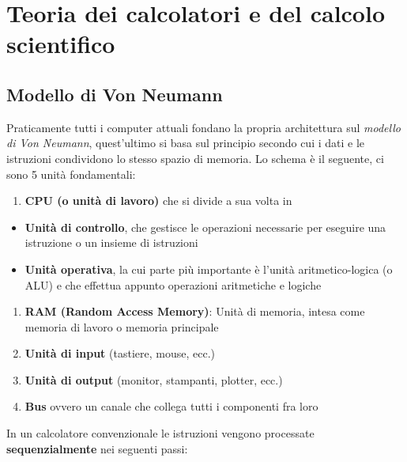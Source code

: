 \documentclass[italian,]{article}
\providecommand{\tightlist}{%
  \setlength{\itemsep}{0pt}\setlength{\parskip}{0pt}}
\begin{document}
\newpage

\section{Teoria dei calcolatori e del calcolo
scientifico}\label{teoria-dei-calcolatori-e-del-calcolo-scientifico}

\subsection{Modello di Von Neumann}\label{modello-di-von-neumann}

Praticamente tutti i computer attuali fondano la propria architettura
sul \emph{modello di Von Neumann}, quest'ultimo si basa sul principio
secondo cui i dati e le istruzioni condividono lo stesso spazio di
memoria. Lo schema è il seguente, ci sono 5 unità fondamentali:

\begin{enumerate}
\def\labelenumi{\arabic{enumi}.}
\tightlist
\item
  \textbf{CPU (o unità di lavoro)} che si divide a sua volta in
\end{enumerate}

\begin{itemize}
\tightlist
\item
  \textbf{Unità di controllo}, che gestisce le operazioni necessarie per
  eseguire una istruzione o un insieme di istruzioni
\item
  \textbf{Unità operativa}, la cui parte più importante è l'unità
  aritmetico-logica (o ALU) e che effettua appunto operazioni
  aritmetiche e logiche
\end{itemize}

\begin{enumerate}
\def\labelenumi{\arabic{enumi}.}
\setcounter{enumi}{1}
\tightlist
\item
  \textbf{RAM (Random Access Memory)}: Unità di memoria, intesa come
  memoria di lavoro o memoria principale
\item
  \textbf{Unità di input} (tastiere, mouse, ecc.)
\item
  \textbf{Unità di output} (monitor, stampanti, plotter, ecc.)
\item
  \textbf{Bus} ovvero un canale che collega tutti i componenti fra loro
\end{enumerate}

In un calcolatore convenzionale le istruzioni vengono processate
\textbf{sequenzialmente} nei seguenti passi:
\end{document}
